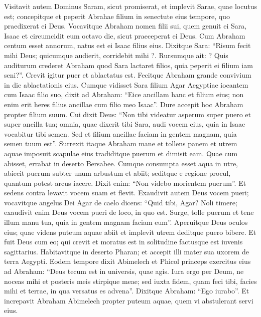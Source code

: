 \begin{biblechapter}  
\verse Visitavit autem Dominus Saram, sicut promiserat, et implevit Sarae, quae locutus est; 
\verse concepitque et peperit Abrahae filium in senectute eius tempore, quo praedixerat ei Deus. 
\verse Vocavitque Abraham nomen filii sui, quem genuit ei Sara, Isaac 
\verse et circumcidit eum octavo die, sicut praeceperat ei Deus. 
\verse Cum Abraham centum esset annorum, natus est ei Isaac filius eius.  
\verse Dixitque Sara: “Risum fecit mihi Deus; quicumque audierit, corridebit mihi ?. 
\verse Rursumque ait: ? Quis auditurum crederet Abraham quod Sara lactaret filios, quia peperit ei filium iam seni?”. 
\verse Crevit igitur puer et ablactatus est. Fecitque Abraham grande convivium in die ablactationis eius. 
\verse Cumque vidisset Sara filium Agar Aegyptiae iocantem cum Isaac filio suo, dixit ad Abraham: 
\verse “Eice ancillam hanc et filium eius; non enim erit heres filius ancillae cum filio meo Isaac”. 
\verse Dure accepit hoc Abraham propter filium suum. 
\verse Cui dixit Deus: “Non tibi videatur asperum super puero et super ancilla tua; omnia, quae dixerit tibi Sara, audi vocem eius, quia in Isaac vocabitur tibi semen. 
\verse Sed et filium ancillae faciam in gentem magnam, quia semen tuum est”. 
\verse Surrexit itaque Abraham mane et tollens panem et utrem aquae imposuit scapulae eius tradiditque puerum et dimisit eam. Quae cum abisset, errabat in deserto Bersabee. 
\verse Cumque consumpta esset aqua in utre, abiecit puerum subter unum arbustum 
\verse et abiit; seditque e regione procul, quantum potest arcus iacere. Dixit enim: “Non videbo morientem puerum”. Et sedens contra levavit vocem suam et flevit. 
\verse Exaudivit autem Deus vocem pueri; vocavitque angelus Dei Agar de caelo dicens: “Quid tibi, Agar? Noli timere; exaudivit enim Deus vocem pueri de loco, in quo est. 
\verse Surge, tolle puerum et tene illum manu tua, quia in gentem magnam faciam eum”. 
\verse Aperuitque Deus oculos eius; quae videns puteum aquae abiit et implevit utrem deditque puero bibere. 
\verse Et fuit Deus cum eo; qui crevit et moratus est in solitudine factusque est iuvenis sagittarius. 
\verse Habitavitque in deserto Pharan; et accepit illi mater sua uxorem de terra Aegypti. 
\verse Eodem tempore dixit Abimelech et Phicol princeps exercitus eius ad Abraham: “Deus tecum est in universis, quae agis. 
\verse Iura ergo per Deum, ne noceas mihi et posteris meis stirpique meae; sed iuxta fidem, quam feci tibi, facies mihi et terrae, in qua versatus es advena”. 
\verse Dixitque Abraham: “Ego iurabo”. 
\verse Et increpavit Abraham Abimelech propter puteum aquae, quem vi abstulerant servi eius. 

\end{biblechapter}
